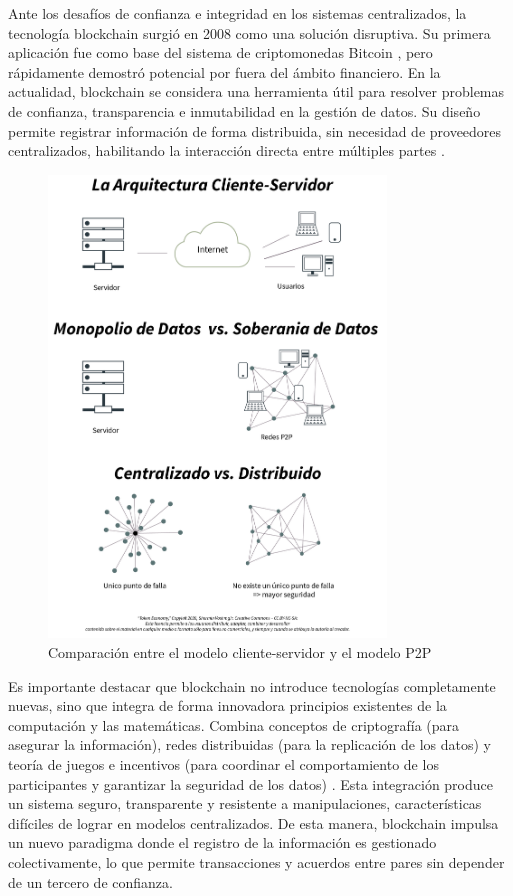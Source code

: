 Ante los desafíos de confianza e integridad en los sistemas centralizados, la tecnología blockchain surgió en 2008 como una solución disruptiva. Su primera aplicación fue como base del sistema de criptomonedas Bitcoin \cite{satoshi2008bitcoin}, pero rápidamente demostró potencial por fuera del ámbito financiero. En la actualidad, blockchain se considera una herramienta útil para resolver problemas de confianza, transparencia e inmutabilidad en la gestión de datos. Su diseño permite registrar información de forma distribuida, sin necesidad de proveedores centralizados, habilitando la interacción directa entre múltiples partes \cite{bulkowska2023implementation}.

\begin{figure}[!htpb]
    \centering
    \includegraphics[width=0.8\textwidth]{Figures/cliente-server-vs-p2p.png}
    \caption{Comparación entre el modelo cliente-servidor y el modelo P2P}
    \label{fig:web-architecture}
\end{figure}

Es importante destacar que blockchain no introduce tecnologías completamente nuevas, sino que integra de forma innovadora principios existentes de la computación y las matemáticas. Combina conceptos de criptografía (para asegurar la información), redes distribuidas (para la replicación de los datos) y teoría de juegos e incentivos (para coordinar el comportamiento de los participantes y garantizar la seguridad de los datos) \cite{sunny2022systematic, bulkowska2023implementation}. Esta integración produce un sistema seguro, transparente y resistente a manipulaciones, características difíciles de lograr en modelos centralizados. De esta manera, blockchain impulsa un nuevo paradigma donde el registro de la información es gestionado colectivamente, lo que permite transacciones y acuerdos entre pares sin depender de un tercero de confianza.

